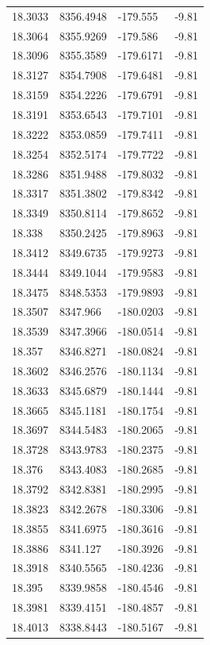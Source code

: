 \begin{table}[H]
\begin{tabular}{llll}
18.3033 & 8356.4948 & -179.555 & -9.81 \\
18.3064 & 8355.9269 & -179.586 & -9.81 \\
18.3096 & 8355.3589 & -179.6171 & -9.81 \\
18.3127 & 8354.7908 & -179.6481 & -9.81 \\
18.3159 & 8354.2226 & -179.6791 & -9.81 \\
18.3191 & 8353.6543 & -179.7101 & -9.81 \\
18.3222 & 8353.0859 & -179.7411 & -9.81 \\
18.3254 & 8352.5174 & -179.7722 & -9.81 \\
18.3286 & 8351.9488 & -179.8032 & -9.81 \\
18.3317 & 8351.3802 & -179.8342 & -9.81 \\
18.3349 & 8350.8114 & -179.8652 & -9.81 \\
18.338 & 8350.2425 & -179.8963 & -9.81 \\
18.3412 & 8349.6735 & -179.9273 & -9.81 \\
18.3444 & 8349.1044 & -179.9583 & -9.81 \\
18.3475 & 8348.5353 & -179.9893 & -9.81 \\
18.3507 & 8347.966 & -180.0203 & -9.81 \\
18.3539 & 8347.3966 & -180.0514 & -9.81 \\
18.357 & 8346.8271 & -180.0824 & -9.81 \\
18.3602 & 8346.2576 & -180.1134 & -9.81 \\
18.3633 & 8345.6879 & -180.1444 & -9.81 \\
18.3665 & 8345.1181 & -180.1754 & -9.81 \\
18.3697 & 8344.5483 & -180.2065 & -9.81 \\
18.3728 & 8343.9783 & -180.2375 & -9.81 \\
18.376 & 8343.4083 & -180.2685 & -9.81 \\
18.3792 & 8342.8381 & -180.2995 & -9.81 \\
18.3823 & 8342.2678 & -180.3306 & -9.81 \\
18.3855 & 8341.6975 & -180.3616 & -9.81 \\
18.3886 & 8341.127 & -180.3926 & -9.81 \\
18.3918 & 8340.5565 & -180.4236 & -9.81 \\
18.395 & 8339.9858 & -180.4546 & -9.81 \\
18.3981 & 8339.4151 & -180.4857 & -9.81 \\
18.4013 & 8338.8443 & -180.5167 & -9.81 \\

\end{tabular}
\end{table}
